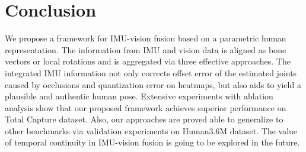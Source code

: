 \documentclass[lettersize,journal]{IEEEtran}
\begin{document}
\section{Conclusion}

We propose a framework for IMU-vision fusion based on a parametric human representation. The information from IMU and vision data is aligned as bone vectors or local rotations and is aggregated via three effective approaches. The integrated IMU information not only corrects offset error of the estimated joints caused by occlusions and quantization error on heatmaps, but also aids to yield a plausible and authentic human pose. Extensive experiments with ablation analysis show that our proposed framework achieves superior performance on Total Capture dataset. Also, our approaches are proved able to generalize to other benchmarks via validation experiments on Human3.6M dataset. The value of temporal continuity in IMU-vision fusion is going to be explored in the future.

{\small


}
\end{document}
